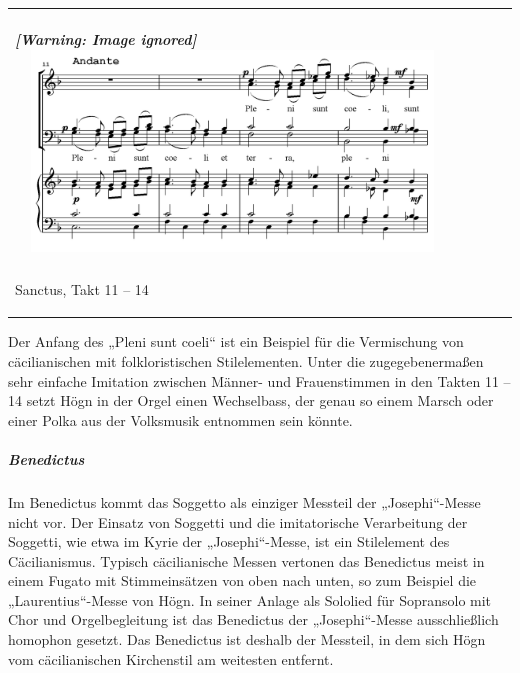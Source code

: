 \begin{center}
\tablefirsthead{}
\tablehead{}
\tabletail{}
\tablelasttail{}
\begin{supertabular}{m{11.689cm}}
\subparagraph[]{  [Warning: Image ignored]
\includegraphics[width=11.506cm,height=5.355cm]{pictures/zulassungsarbeit-img121.png}
 }
Sanctus, Takt 11 – 14\\
\end{supertabular}
\end{center}
Der Anfang des „Pleni sunt coeli“ ist ein Beispiel für die Vermischung
von cäcilianischen mit folkloristischen Stilelementen. Unter die
zugegebenermaßen sehr einfache Imitation zwischen Männer- und
Frauenstimmen in den Takten 11 – 14 setzt Högn in der Orgel einen
Wechselbass, der genau so einem Marsch oder einer Polka aus der
Volksmusik entnommen sein könnte.

\subparagraph{Benedictus}
Im Benedictus kommt das Soggetto als einziger Messteil der
„Josephi“-Messe nicht vor. Der Einsatz von Soggetti und die
imitatorische Verarbeitung der Soggetti, wie etwa im Kyrie der
„Josephi“-Messe, ist ein Stilelement des Cäcilianismus. Typisch
cäcilianische Messen vertonen das Benedictus meist in einem Fugato mit
Stimmeinsätzen von oben nach unten, so zum Beispiel die
„Laurentius“-Messe von Högn. In seiner Anlage als Sololied für
Sopransolo mit Chor und Orgelbegleitung ist das Benedictus der
„Josephi“-Messe ausschließlich homophon gesetzt. Das Benedictus ist
deshalb der Messteil, in dem sich Högn vom cäcilianischen Kirchenstil
am weitesten entfernt.

